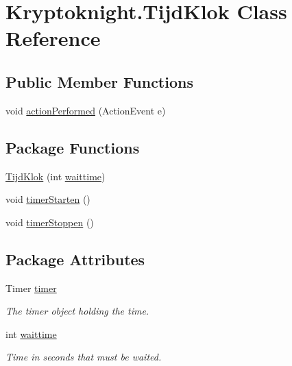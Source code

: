 \hypertarget{class_kryptoknight_1_1_tijd_klok}{
\section{Kryptoknight.Tijd\-Klok Class Reference}
\label{class_kryptoknight_1_1_tijd_klok}
}
\subsection*{Public Member Functions}
\begin{CompactItemize}
\item 
void \hyperlink{class_kryptoknight_1_1_tijd_klok_a0}{action\-Performed} (Action\-Event e)
\end{CompactItemize}
\subsection*{Package Functions}
\begin{CompactItemize}
\item 
\hyperlink{class_kryptoknight_1_1_tijd_klok_c0}{Tijd\-Klok} (int \hyperlink{class_kryptoknight_1_1_tijd_klok_q1}{waittime})
\item 
void \hyperlink{class_kryptoknight_1_1_tijd_klok_c1}{timer\-Starten} ()
\item 
void \hyperlink{class_kryptoknight_1_1_tijd_klok_c2}{timer\-Stoppen} ()
\end{CompactItemize}
\subsection*{Package Attributes}
\begin{CompactItemize}
\item 
\hypertarget{class_kryptoknight_1_1_tijd_klok_q0}{
Timer \hyperlink{class_kryptoknight_1_1_tijd_klok_q0}{timer}}
\label{class_kryptoknight_1_1_tijd_klok_q0}

\begin{CompactList}\small\item\em The timer object holding the time. \item\end{CompactList}\item 
\hypertarget{class_kryptoknight_1_1_tijd_klok_q1}{
int \hyperlink{class_kryptoknight_1_1_tijd_klok_q1}{waittime}}
\label{class_kryptoknight_1_1_tijd_klok_q1}

\begin{CompactList}\small\item\em Time in seconds that must be waited. \item\end{CompactList}\end{CompactItemize}


